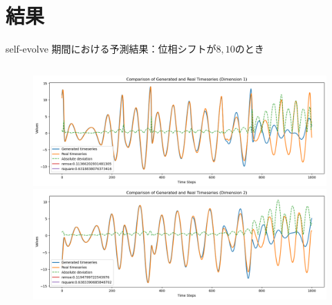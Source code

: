 \section{結果}
\begin{frame}{self-evolve 期間における予測結果：位相シフトが$8, 10$のとき}
  \begin{columns}[T] %
    \begin{column}{.5\textwidth}
      \begin{figure}
        \vspace{-.5cm}
        \begin{minipage}[c][.27\textheight][c]{\linewidth}
          \centering
          \includegraphics[width=0.7\linewidth]{Fig/8.x.png}
        \end{minipage}
    
        \vspace{-.5em}

        \begin{minipage}[c][.27\textheight][c]{\linewidth}
          \centering
          \includegraphics[width=0.7\linewidth]{Fig/8.y.png}
        \end{minipage}
        

\end{figure}
\end{column}
\end{columns}
\end{frame}
